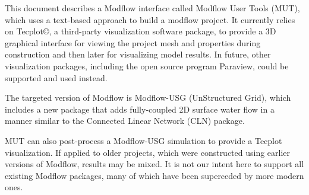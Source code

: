 This document describes a Modflow interface called Modflow User Tools (MUT), which uses a
text-based approach to build a modflow project.  It currently relies on Tecplot\copyright, a third-party visualization software package,
to provide a 3D graphical interface for viewing the project mesh and properties during construction and then later for visualizing model results. In future, other visualization packages, including the open source program Paraview, could be supported and used instead.

The targeted version of Modflow is Modflow-USG (UnStructured Grid), which includes a new package that adds fully-coupled 2D surface water flow in a manner similar to the Connected Linear Network (CLN) package.

MUT can also post-process a Modflow-USG simulation to provide a Tecplot visualization.  If applied to older projects, which were constructed using earlier versions of Modflow, results may be mixed.  It is not our intent here to support all existing Modflow packages, many of which have been superceded by more modern ones. 